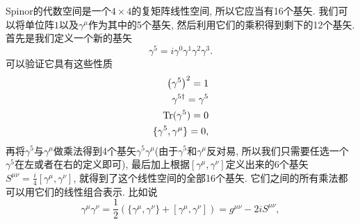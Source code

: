 Spinor的代数空间是一个$4\times4$的复矩阵线性空间, 所以它应当有16个基矢. 我们可以将单位阵$1$以及$\gamma^\mu$作为其中的5个基矢, 然后利用它们的乘积得到剩下的12个基矢. 首先是我们定义一个新的基矢
\begin{equation}
    \gamma^5=i\gamma^0\gamma^1\gamma^2\gamma^3.
\end{equation}
可以验证它具有这些性质
\begin{align}
    \left(\gamma^5\right)^2=1\\
    \gamma^{5\dagger}=\gamma^5\\
    \rm{Tr}(\gamma^5)=0\\
    \{\gamma^5, \gamma^\mu\}=0,
\end{align}
再将$\gamma^5$与$\gamma^\mu$做乘法得到4个基矢$\gamma^5\gamma^\mu$(由于$\gamma^5$和$\gamma^\mu$反对易, 所以我们只需要任选一个$\gamma^5$在左或者在右的定义即可), 最后加上根据$[\gamma^\mu, \gamma^\nu]$定义出来的6个基矢$S^{\mu\nu}=\frac i4[\gamma^\mu, \gamma^\nu]$, 就得到了这个线性空间的全部16个基矢. 它们之间的所有乘法都可以用它们的线性组合表示. 比如说
\begin{equation}
    \gamma^\mu\gamma^\nu=\frac12\left(\{\gamma^\mu, \gamma^\nu\}+[\gamma^\mu, \gamma^\nu]\right)=g^{\mu\nu}-2iS^{\mu\nu},
\end{equation}


